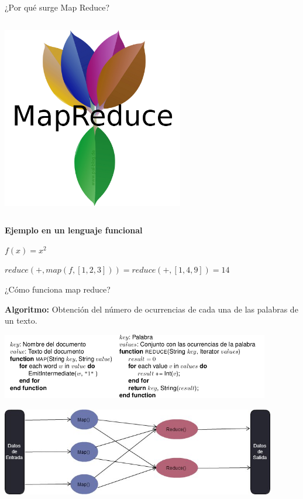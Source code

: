 \begin{frame}{¿Por qué surge Map Reduce?}
\begin{columns}
					\centering
					\includegraphics[width=0.6\textwidth]{./Images/mapreduce-logo.png}
			\end{columns}		

			\kern3mm
			\begin{tcolorbox}[colback=ChetwodeBlue!10,colframe=ChetwodeBlue!60]
				\centering
				\fontsize{10}{8}\selectfont	
				\textbf{Ejemplo en un lenguaje funcional}
				\fontsize{9}{8}\selectfont								

				\kern 1mm	
				$f(x) = x^2$

				\kern 1mm
				$reduce(+, map(f, [1,2,3])) = reduce(+, [1,4,9]) = 14$
			\end{tcolorbox}	
		\end{frame}


		\begin{frame}{¿Cómo funciona map reduce?}
			
			\fontsize{7}{8}\selectfont	
			\centering
			
			\noindent\makebox[\linewidth]{\rule{\textwidth}{0.4pt}}			
			\textbf{Algoritmo:} Obtención del número de ocurrencias de cada una de las palabras de un texto.
			\noindent\makebox[\linewidth]{\rule{\textwidth}{0.4pt}}

			\kern2mm					
			\includegraphics[width=0.88\textwidth]{./Images/count-words.png}		


			\noindent\makebox[\linewidth]{\rule{\textwidth}{0.4pt}}

			\kern2mm					
			\includegraphics[width=0.9\textwidth]{./Images/MapReduce.jpg}
		\end{frame}


